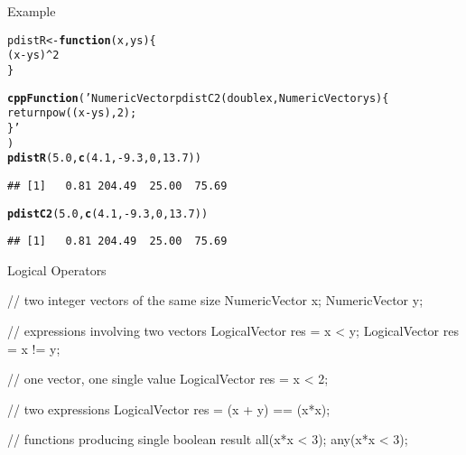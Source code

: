 \documentclass{beamer}\usepackage[]{graphicx}\usepackage[]{color}
\makeatletter
\newcommand{\hlnum}[1]{\textcolor[rgb]{0.686,0.059,0.569}{#1}}%
\newcommand{\hlstr}[1]{\textcolor[rgb]{0.192,0.494,0.8}{#1}}%
\newcommand{\hlopt}[1]{\textcolor[rgb]{0,0,0}{#1}}%
\newcommand{\hlstd}[1]{\textcolor[rgb]{0.345,0.345,0.345}{#1}}%
\newcommand{\hlkwa}[1]{\textcolor[rgb]{0.161,0.373,0.58}{\textbf{#1}}}%
\newcommand{\hlkwb}[1]{\textcolor[rgb]{0.69,0.353,0.396}{#1}}%
\newcommand{\hlkwc}[1]{\textcolor[rgb]{0.333,0.667,0.333}{#1}}%
\newcommand{\hlkwd}[1]{\textcolor[rgb]{0.737,0.353,0.396}{\textbf{#1}}}%
\newenvironment{kframe}{%
 \def\at@end@of@kframe{}%
 \ifinner\ifhmode%
  \def\at@end@of@kframe{\end{minipage}}%
  \begin{minipage}{\columnwidth}%
 \fi\fi%
 \def\FrameCommand##1{\hskip\@totalleftmargin \hskip-\fboxsep
 \colorbox{shadecolor}{##1}\hskip-\fboxsep
     \hskip-\linewidth \hskip-\@totalleftmargin \hskip\columnwidth}%
 \MakeFramed {\advance\hsize-\width
   \@totalleftmargin\z@ \linewidth\hsize
   \@setminipage}}%
 {\par\unskip\endMakeFramed%
 \at@end@of@kframe}
\newenvironment{knitrout}{}{} %
\makeatother
\begin{document}
\begin{frame}[fragile]{Example}
\begin{knitrout}\footnotesize
{}\color{fgcolor}\begin{kframe}
\begin{alltt}
\hlstd{pdistR} \hlkwb{<-} \hlkwa{function}\hlstd{(}\hlkwc{x}\hlstd{,} \hlkwc{ys}\hlstd{) \{}
    \hlstd{(x} \hlopt{-} \hlstd{ys)}\hlopt{^}\hlnum{2}
\hlstd{\}}

\hlkwd{cppFunction}\hlstd{(}\hlstr{'NumericVector pdistC2(double x, NumericVector ys) \{
            return pow((x-ys), 2);
\}'}
\hlstd{)}
\hlkwd{pdistR}\hlstd{(}\hlnum{5.0}\hlstd{,} \hlkwd{c}\hlstd{(}\hlnum{4.1}\hlstd{,}\hlopt{-}\hlnum{9.3}\hlstd{,}\hlnum{0}\hlstd{,} \hlnum{13.7}\hlstd{))}
\end{alltt}
\begin{verbatim}
## [1]   0.81 204.49  25.00  75.69
\end{verbatim}
\begin{alltt}
\hlkwd{pdistC2}\hlstd{(}\hlnum{5.0}\hlstd{,} \hlkwd{c}\hlstd{(}\hlnum{4.1}\hlstd{,}\hlopt{-}\hlnum{9.3}\hlstd{,}\hlnum{0}\hlstd{,} \hlnum{13.7}\hlstd{))}
\end{alltt}
\begin{verbatim}
## [1]   0.81 204.49  25.00  75.69
\end{verbatim}
\end{kframe}
\end{knitrout}
\end{frame}
\begin{frame}[fragile]{Logical Operators}
    \begin{verbatimtab}
    // two integer vectors of the same size
    NumericVector x;
    NumericVector y;

    // expressions involving two vectors
    LogicalVector res = x < y;
    LogicalVector res = x != y;

    // one vector, one single value
    LogicalVector res = x < 2;

    // two expressions
    LogicalVector res = (x + y) == (x*x);

    // functions producing single boolean result
    all(x*x < 3);
    any(x*x < 3);

    \end{verbatimtab}
\end{frame}
\end{document}
